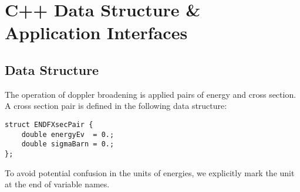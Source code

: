 
\section{C++ Data Structure \& Application Interfaces}
\subsection{Data Structure}
The operation of doppler broadening is applied pairs of energy and cross section. A cross section pair is defined in the following data structure:
\begin{verbatim} 
struct ENDFXsecPair {
    double energyEv  = 0.;
    double sigmaBarn = 0.;
};
\end{verbatim}
To avoid potential confusion in the units of energies, we explicitly mark the unit at the end of variable names.

